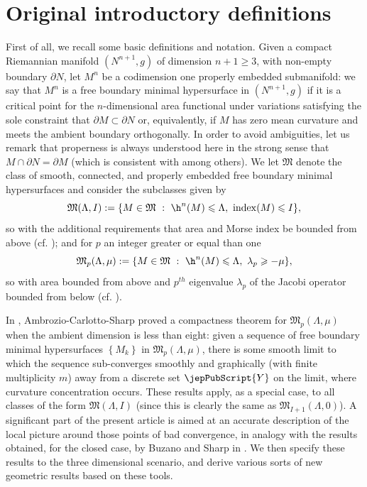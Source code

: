 \section*{Original introductory definitions}
First of all, we recall some basic definitions and notation. Given a compact Riemannian manifold $(N^{n+1},g)$ of dimension $n+1\geqslant 3$, with non-empty boundary $\partial N$, let $M^n$ be a codimension one properly embedded submanifold: we say that $M^n$ is a free boundary minimal hypersurface in $(N^{n+1},g)$ if it is a critical point for the $n$-dimensional area functional under variations satisfying the sole constraint that $\partial M\subset\partial N$ or, equivalently, if $M$ has zero mean curvature and meets the ambient boundary orthogonally. In order to avoid ambiguities, let us remark that properness is always understood here in the strong sense that $M \cap \partial N=\partial M$ (which is consistent with \cite{FL14, LZ16B, ACS17, ACS18b} among others).
    We let $\mathfrak{M}$ denote the class of smooth, connected, and properly embedded free boundary minimal hypersurfaces and consider the subclasses given by
     	\[
     		\mathfrak{M}(\Lambda,I) := \{ M \in \mathfrak{M} \ : \ \h^n(M) \leqslant \Lambda,\ \operatorname{index}(M) \leqslant I\},
     			\]
     			so with the additional requirements that area and Morse index be bounded from above (cf. \cite{Sha15}); and for $p$ an integer greater or equal than one
     \[
     			\mathfrak{M}_p(\Lambda,\mu) := \{ M \in \mathfrak{M} \ : \ \h^n(M) \leqslant \Lambda,\ \lambda_p \geqslant -\mu\},
     			\]
     			so with area bounded from above and $p^{th}$ eigenvalue $\lambda_p$ of the Jacobi operator bounded from below (cf. \cite{ACS15}).	
     			
     			
     		
     		In \cite{ACS17}, Ambrozio-Carlotto-Sharp proved a compactness theorem for $\mathfrak{M}_p(\Lambda,\mu)$ when the ambient dimension is less than eight: given a sequence of free boundary minimal hypersurfaces $\left\{M_k\right\}$ in $\mathfrak{M}_p(\Lambda,\mu)$, there is some smooth limit to which the sequence sub-converges smoothly and graphically (with finite multiplicity $m$) away from a discrete set ${\jepPubScript{Y}}$ on the limit, where curvature concentration occurs. These results apply, as a special case, to all classes of the form $\mathfrak{M}(\Lambda,I)$ (since this is clearly the same as $\mathfrak{M}_{I+1}(\Lambda,0)$). 
     			A significant part of the present article is aimed at an accurate description of the local picture around those points of bad convergence, in analogy with the results obtained, for the closed case, by Buzano and Sharp in \cite{BS17}. We then specify these results to the three dimensional scenario, and derive various sorts of new geometric results based on these tools.	\\
     			
